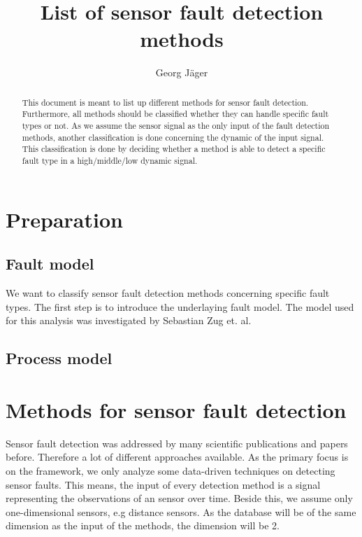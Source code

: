 \documentclass[a4paper,11pt]{article}
\title{List of sensor fault detection methods}
\author{Georg Jäger}
\begin{document}
\maketitle
\tableofcontents

\begin{abstract}
 This document is meant to list up different methods for sensor fault detection. Furthermore, all methods should be classified whether they can handle specific fault types or not. As we assume the sensor signal as the only input of the fault detection methods, another classification is done concerning the dynamic of the input signal. This classification is done by deciding whether a method is able to detect a specific fault type in a high/middle/low dynamic signal. 
\end{abstract}

\section{Preparation}
 
\subsection{Fault model}  
  We want to classify sensor fault detection methods concerning specific fault types. The first step is to introduce the underlaying fault model. The model used for this analysis was investigated by Sebastian Zug et. al. %
  

\subsection{Process model}


\section{Methods for sensor fault detection}

Sensor fault detection was addressed by many scientific publications and papers before. Therefore a lot of different approaches available. As the primary focus is on the framework, we only analyze some data-driven techniques on detecting sensor faults. This means, the input of every detection method is a signal representing the observations of an sensor over time. Beside this, we assume only one-dimensional sensors, e.g distance sensors. As the database will be of the same dimension as the input of the methods, the dimension will be 2. 
\end{document}
